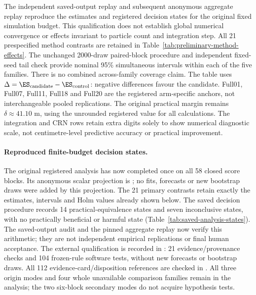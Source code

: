 The independent saved-output replay and subsequent anonymous aggregate replay
reproduce the estimates and registered decision states for the original fixed
simulation budget. This qualification does not establish global numerical
convergence or effects invariant to particle count and integration step.
All 21 prespecified
method contrasts are retained in Table~\ref{tab:preliminary-method-effects}.
The unchanged 2000-draw paired-block procedure and independent fixed-seed
tail check provide nominal 95\% simultaneous intervals within each of the
five families. There is no combined across-family coverage claim.
The table uses $\Delta=\ES_{\mathrm{candidate}}-\ES_{\mathrm{control}}$:
negative differences favour the candidate. Full01, Full07, Full11, Full18 and
Full20 are the registered arm-specific anchors, not interchangeable pooled
replications. The original practical margin remains $\delta\approx41.10$ m,
using the unrounded registered value for all calculations. The integration
and CRN rows retain extra digits solely to show numerical diagnostic scale,
not centimetre-level predictive accuracy or practical improvement.

\paragraph{Reproduced finite-budget decision states.}
\label{sec:saved-analysis-status}\hypertarget{sec:saved-analysis-status}{}
The original registered analysis has now completed once on all 58 closed
score blocks. Its anonymous scalar projection is
; no fits, forecasts or
new bootstrap draws were added by this projection. The 21 primary contrasts
retain exactly the estimates, intervals and Holm values already shown below.
The saved decision procedure records 14 practical-equivalence states and
seven inconclusive states, with no practically beneficial or harmful state
(Table~\ref{tab:saved-analysis-states}). The saved-output audit and the pinned
aggregate replay now verify this arithmetic; they are not independent empirical
replications or final human acceptance. The external qualification is recorded
in : 21 evidence/provenance
checks and 104 frozen-rule software tests, without new forecasts or bootstrap
draws. All 112 evidence-card/disposition references are checked in
. All three origin
modes and four whole unavailable comparison families remain in the analysis;
the two six-block secondary modes do not acquire hypothesis tests.

